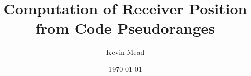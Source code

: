 \documentclass[a4paper,11pt]{article}
\begin{document}
 
\title{Computation of Receiver Position from Code Pseudoranges}
\author{Kevin Mead}

\date{\today} 
\maketitle 











\end{document}
